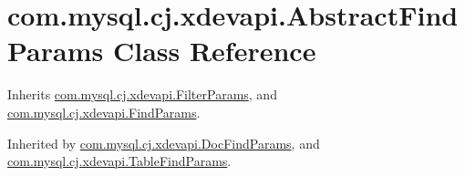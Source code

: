\hypertarget{classcom_1_1mysql_1_1cj_1_1xdevapi_1_1_abstract_find_params}{}\section{com.\+mysql.\+cj.\+xdevapi.\+Abstract\+Find\+Params Class Reference}
\label{classcom_1_1mysql_1_1cj_1_1xdevapi_1_1_abstract_find_params}


Inherits \mbox{\hyperlink{classcom_1_1mysql_1_1cj_1_1xdevapi_1_1_filter_params}{com.\+mysql.\+cj.\+xdevapi.\+Filter\+Params}}, and \mbox{\hyperlink{interfacecom_1_1mysql_1_1cj_1_1xdevapi_1_1_find_params}{com.\+mysql.\+cj.\+xdevapi.\+Find\+Params}}.



Inherited by \mbox{\hyperlink{classcom_1_1mysql_1_1cj_1_1xdevapi_1_1_doc_find_params}{com.\+mysql.\+cj.\+xdevapi.\+Doc\+Find\+Params}}, and \mbox{\hyperlink{classcom_1_1mysql_1_1cj_1_1xdevapi_1_1_table_find_params}{com.\+mysql.\+cj.\+xdevapi.\+Table\+Find\+Params}}.

